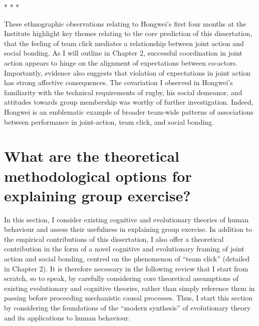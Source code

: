 \begin{center}
  * * *
\end{center}

These ethnographic observations relating to Hongwei's first four months at the Institute highlight key themes relating to the core prediction of this dissertation, that the feeling of team click mediates a relationship between joint action and social bonding.  As I will outline in Chapter 2, successful coordination in joint action appears to hinge on the alignment of expectations between co-actors.  Importantly, evidence also suggests that violation of expectations in joint action has strong affective consequences.  The covariation I observed in Hongwei's familiarity with the technical requirements of rugby, his social demeanor, and attitudes towards group membership was worthy of further investigation.  Indeed, Hongwei is an emblematic example of broader team-wide patterns of associations between performance in joint-action, team click, and social bonding.

















\section{What are the theoretical methodological options for explaining group exercise?}

In this section, I consider existing cognitive and evolutionary theories of human behaviour and assess their usefulness in explaining group exercise. In addition to the empirical contributions of this dissertation, I also offer a theoretical contribution in the form of a novel cognitive and evolutionary framing of joint action and social bonding, centred on the phenomenon of ``team click'' (detailed in Chapter 2). It is therefore necessary in the following review that I start from scratch, so to speak, by carefully considering core theoretical assumptions of existing evolutionary and cognitive theories, rather than simply reference them in passing before proceeding mechanistic causal processes.  Thus, I start this section by considering the foundations of the ``modern synthesis'' of evolutionary theory and its applications to human behaviour.

